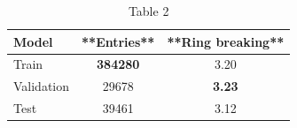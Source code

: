 \begin{table}[t]
\centering
\caption{Table 2}
\label{tab:2611.03696}
\begin{tabular}{lcc}
\toprule
Model & **Entries** & **Ring breaking** \\
\midrule
Train & \textbf{384280} & 3.20 \\
Validation & 29678 & \textbf{3.23} \\
Test & 39461 & 3.12 \\
\bottomrule
\end{tabular}
\end{table}
